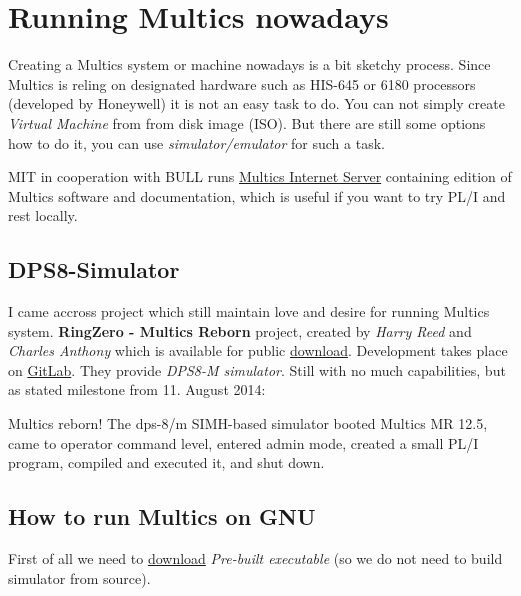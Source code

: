 %

\section{Running Multics nowadays}

Creating a Multics system or machine nowadays is a bit sketchy process. Since Multics is reling on designated hardware 
such as HIS-645 or 6180 processors (developed by Honeywell) it is not an easy task to do.
You can not simply create \textit{Virtual Machine} from from disk image (ISO). But there are still some options how to do it, 
you can use \textit{simulator/emulator} for such a task. 

MIT in cooperation with BULL runs \href{https://web.mit.edu/multics-history/source/Multics_Internet_Server/Multics_sources.html}{Multics Internet Server}
containing edition of Multics software and documentation, which is useful if you want to try PL/I and rest locally.


\subsection{DPS8-Simulator}

I came accross project which still maintain love and desire for running Multics system.
\textbf{RingZero - Multics Reborn} project, created by \textit{Harry Reed} and \textit{Charles Anthony} which is available for 
public \href{http://ringzero.wikidot.com/}{download}. Development takes place on \href{https://gitlab.com/dps8m/dps8m}{GitLab}. 
They provide \textit{DPS8-M simulator}. Still with no much capabilities, but as stated milestone from 11. August 2014:

\begin{displayquote}
Multics reborn! The dps-8/m SIMH-based simulator booted Multics MR 12.5, came to operator command level, entered 
admin mode, created a small PL/I program, compiled and executed it, and shut down.
\end{displayquote}

\subsection{How to run Multics on GNU\Linux}
First of all we need to \href{ringzero.wikidot.com/local--files/start/dps8m_linux.tgz}{download} 
\textit{Pre-built executable} (so we do not need to build simulator from source).

